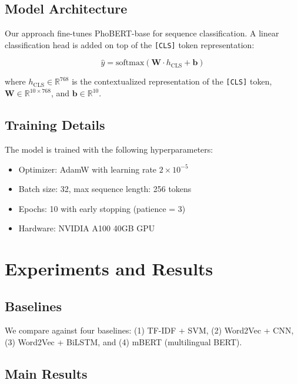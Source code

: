 \documentclass[conference]{IEEEtran}
\begin{document}
\subsection{Model Architecture}

Our approach fine-tunes PhoBERT-base \cite{Le2024bert} for sequence
classification. A linear classification head is added on top of the
\texttt{[CLS]} token representation:

\begin{equation}
  \label{eq:classifier}
  \hat{y} = \text{softmax}(\mathbf{W} \cdot h_{\text{CLS}} + \mathbf{b})
\end{equation}

where $h_{\text{CLS}} \in \mathbb{R}^{768}$ is the contextualized
representation of the \texttt{[CLS]} token, $\mathbf{W} \in \mathbb{R}^{10 \times 768}$,
and $\mathbf{b} \in \mathbb{R}^{10}$.

\subsection{Training Details}

The model is trained with the following hyperparameters:
\begin{itemize}
  \item Optimizer: AdamW \cite{Pytorch2024} with learning rate $2 \times 10^{-5}$
  \item Batch size: 32, max sequence length: 256 tokens
  \item Epochs: 10 with early stopping (patience = 3)
  \item Hardware: NVIDIA A100 40GB GPU
\end{itemize}

\section{Experiments and Results}

\subsection{Baselines}

We compare against four baselines:
(1) TF-IDF + SVM, (2) Word2Vec + CNN, (3) Word2Vec + BiLSTM,
and (4) mBERT (multilingual BERT).

\subsection{Main Results}
\end{document}
